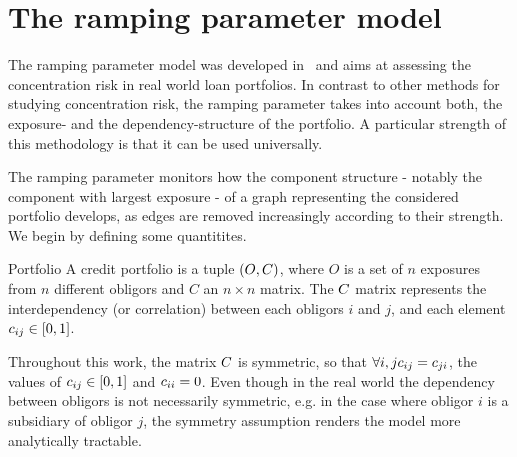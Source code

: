 \documentclass[12pt,beltcrest]{ociamthesis} %
\begin{document}

\section{The ramping parameter model} %
\label{sec:ramping_parameter}

The ramping parameter model was developed in~\cite{Sindel:2009vd} and aims at assessing the concentration risk in real world loan portfolios. 
In contrast to other methods for studying concentration risk, the ramping parameter takes into account both, the exposure- and the dependency-structure of the portfolio.
A particular strength of this methodology is that it can be used universally.

The ramping parameter monitors how the component structure - notably the component with largest exposure - of a graph representing the considered portfolio develops, as edges are removed increasingly according to their strength.
We begin by defining some quantitites.

\begin{definition}{Portfolio}
A credit portfolio is a tuple $(O, C)$, where $O$ is a set of $n$ exposures from $n$ different obligors and $C$ an $n \times n$ matrix.
The $C$ matrix represents the interdependency (or correlation) between each obligors $i$ and $j$, and each element $c_{ij} \in [0,1]$.
\end{definition}

\begin{remark}
Throughout this work, the matrix $C$ is symmetric, so that $\forall i,j c_{ij} = c_{ji}$, the values of $c_{ij} \in [0,1]$ and $c_{ii} = 0$.
Even though in the real world the dependency between obligors is not necessarily symmetric, e.g. in the case where obligor $i$ is a subsidiary of obligor $j$, the symmetry assumption renders the model more analytically tractable.
\end{remark}
\end{document}
